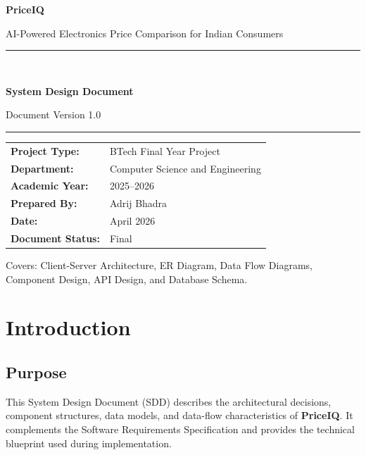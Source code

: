 \documentclass[12pt,a4paper]{report}
\begin{document}
\begin{titlepage}
  \centering
  \vspace*{1.8cm}
  {\Huge\bfseries\color{priblue} PriceIQ\par}
  \vspace{0.4cm}
  {\large AI-Powered Electronics Price Comparison for Indian Consumers\par}
  \vspace{1.4cm}
  \rule{0.85\linewidth}{1.5pt}\\[0.5cm]
  {\LARGE\bfseries System Design Document\par}
  \vspace{0.3cm}
  {\large Document Version 1.0\par}
  \rule{0.85\linewidth}{1.5pt}
  \vspace{1.8cm}

  \begin{tabular}{@{}ll@{}}
    \textbf{Project Type:}    & BTech Final Year Project \\[4pt]
    \textbf{Department:}      & Computer Science and Engineering \\[4pt]
    \textbf{Academic Year:}   & 2025--2026 \\[4pt]
    \textbf{Prepared By:}     & Adrij Bhadra \\[4pt]
    \textbf{Date:}            & April 2026 \\[4pt]
    \textbf{Document Status:} & Final \\
  \end{tabular}

  \vfill
  {\small Covers: Client-Server Architecture, ER Diagram, Data Flow Diagrams,\\
  Component Design, API Design, and Database Schema.}
\end{titlepage}

\tableofcontents
\newpage

\chapter{Introduction}

\section{Purpose}
This System Design Document (SDD) describes the architectural decisions,
component structures, data models, and data-flow characteristics of
\textbf{PriceIQ}. It complements the Software Requirements Specification and
provides the technical blueprint used during implementation.
\end{document}
